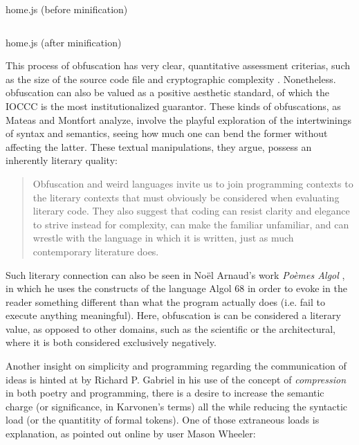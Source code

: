 \begin{listing}
  \inputminted{js}{./corpus/home.js}
  \caption{home.js (before minification)}
  \label{code:home_js}
\end{listing}

\begin{listing}
  \inputminted{js}{./corpus/home_minified.js}
  \caption{home.js (after minification)}
  \label{code:home_minified_js}
\end{listing}

This process of obfuscation has very clear, quantitative assessment criterias, such as the size of the source code file and cryptographic complexity \citep{pellet-mary_co6gc_2020}. Nonetheless. obfuscation can also be valued as a positive aesthetic standard, of which the IOCCC is the most institutionalized guarantor. These kinds of obfuscations, as Mateas and Montfort analyze, involve the playful exploration of the intertwinings of syntax and semantics, seeing how much one can bend the former without affecting the latter. These textual manipulations, they argue, possess an inherently literary quality:

\begin{quote}
  Obfuscation and weird languages invite us to join programming contexts to the literary contexts that must obviously be considered when evaluating literary code. They also suggest that coding can resist clarity and elegance to strive instead for complexity, can make the familiar unfamiliar, and can wrestle with the language in which it is written, just as much contemporary literature does. \citep{mateas_box_2005}
\end{quote}

Such literary connection can also be seen in Noël Arnaud's work \emph{Poèmes Algol} \citep{arnaud_poemes_1968}, in which he uses the constructs of the language Algol 68 in order to evoke in the reader something different than what the program actually does (i.e. fail to execute anything meaningful). Here, obfuscation is can be considered a literary value, as opposed to other domains, such as the scientific or the architectural, where it is both considered exclusively negatively.

Another insight on simplicity and programming regarding the communication of ideas is hinted at by Richard P. Gabriel in his use of the concept of \emph{compression} in both poetry and programming, there is a desire to increase the semantic charge (or significance, in Karvonen's terms) all the while reducing the syntactic load (or the quantitity of formal tokens). One of those extraneous loads is explanation, as pointed out online by user Mason Wheeler:

